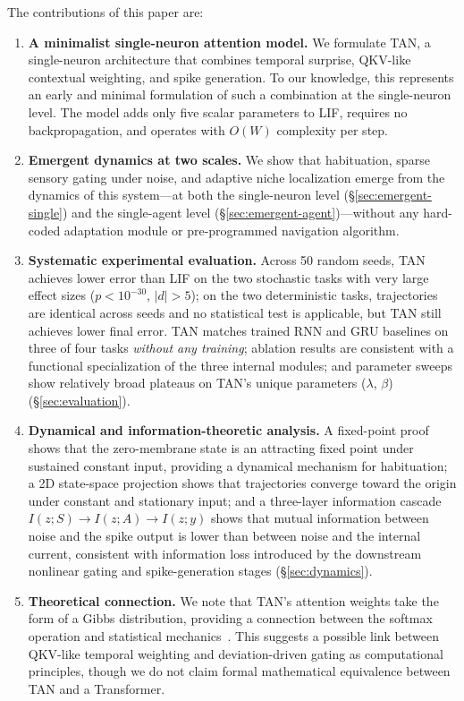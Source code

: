 The contributions of this paper are:

\begin{enumerate}[label=(\arabic*), leftmargin=2.5em, itemsep=0.2em]
    \item \textbf{A minimalist single-neuron attention model.} We formulate TAN, a single-neuron architecture that combines temporal surprise, QKV-like contextual weighting, and spike generation. To our knowledge, this represents an early and minimal formulation of such a combination at the single-neuron level. The model adds only five scalar parameters to LIF, requires no backpropagation, and operates with $O(W)$ complexity per step.

    \item \textbf{Emergent dynamics at two scales.} We show that habituation, sparse sensory gating under noise, and adaptive niche localization emerge from the dynamics of this system---at both the single-neuron level (\S\ref{sec:emergent-single}) and the single-agent level (\S\ref{sec:emergent-agent})---without any hard-coded adaptation module or pre-programmed navigation algorithm.

    \item \textbf{Systematic experimental evaluation.} Across 50 random seeds, TAN achieves lower error than LIF on the two stochastic tasks with very large effect sizes ($p<10^{-30}$, $|d|>5$); on the two deterministic tasks, trajectories are identical across seeds and no statistical test is applicable, but TAN still achieves lower final error. TAN matches trained RNN and GRU baselines on three of four tasks \textit{without any training}; ablation results are consistent with a functional specialization of the three internal modules; and parameter sweeps show relatively broad plateaus on TAN's unique parameters ($\lambda$, $\beta$) (\S\ref{sec:evaluation}).

    \item \textbf{Dynamical and information-theoretic analysis.} A fixed-point proof shows that the zero-membrane state is an attracting fixed point under sustained constant input, providing a dynamical mechanism for habituation; a 2D state-space projection shows that trajectories converge toward the origin under constant and stationary input; and a three-layer information cascade $I(z; S) \to I(z; A) \to I(z; y)$ shows that mutual information between noise and the spike output is lower than between noise and the internal current, consistent with information loss introduced by the downstream nonlinear gating and spike-generation stages (\S\ref{sec:dynamics}).

    \item \textbf{Theoretical connection.} We note that TAN's attention weights take the form of a Gibbs distribution, providing a connection between the softmax operation and statistical mechanics~\cite{jaynes1957,boltzmann1868,gibbs1902,bahri2020}. This suggests a possible link between QKV-like temporal weighting and deviation-driven gating as computational principles, though we do not claim formal mathematical equivalence between TAN and a Transformer.
\end{enumerate}


